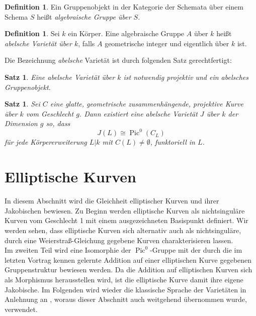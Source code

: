\documentclass{amsart}
\theoremstyle{plain}
\newtheorem{proposition}[subsection]{Satz}
\theoremstyle{definition}
\newtheorem{definition}[subsection]{Definition}
\newcommand{\pic}{\operatorname{Pic}}
\begin{document}
\begin{definition}
	Ein Gruppenobjekt in der Kategorie der Schemata über einem Schema $S$ heißt {\it algebraische Gruppe über $S$}.
\end{definition}

\begin{definition}
	Sei $k$ ein Körper. Eine algebraische Gruppe $A$ über $k$ heißt {\it abelsche Varietät über $k$}, falls $A$ geometrische integer und eigentlich über $k$ ist.
\end{definition}

\noindent Die Bezeichnung {\it abelsche} Varietät ist durch folgenden Satz gerechtfertigt:
\begin{proposition}
	Eine abelsche Varietät über $k$ ist notwendig projektiv und ein abelsches Gruppenobjekt.
\end{proposition}

\begin{proposition}
	Sei $C$ eine glatte, geometrische zusammenhängende, projektive Kurve über $k$ vom Geschlecht $g$. Dann existiert eine abelsche Varietät $J$ über $k$ der Dimension $g$ so, dass 
	\begin{equation*}
		J(L) \cong \pic^0(C_L)
	\end{equation*}
	für jede Körpererweiterung $L|k$ mit $C(L) \neq \emptyset$, funktoriell in $L$.
\end{proposition}




\section{Elliptische Kurven}
\label{section-elliptische-kurven}

In diesem Abschnitt wird die Gleichheit elliptischer Kurven und ihrer Jakobischen bewiesen.
Zu Beginn werden elliptische Kurven als nichtsinguläre Kurven vom Geschlecht 1 mit einem ausgezeichneten Basispunkt definiert.
Wir werden sehen, dass elliptische Kurven sich alternativ auch als nichtsinguläre, durch eine Weierstraß-Gleichung gegebene Kurven charakterisieren lassen. \\
Im zweiten Teil wird eine Isomorphie der $\pic^0$-Gruppe mit der durch die im letzten Vortrag kennen gelernte Addition auf einer elliptischen Kurve gegebenen Gruppenstruktur bewiesen werden.
Da die Addition auf elliptischen Kurven sich als Morphismus herausstellen wird, ist die elliptische Kurve damit ihre eigene Jakobische.
Im Folgenden wird wieder die klassische Sprache der Varietäten in Anlehnung an \cite{silverman}, woraus dieser Abschnitt auch weitgehend übernommen wurde, verwendet.
\end{document}
